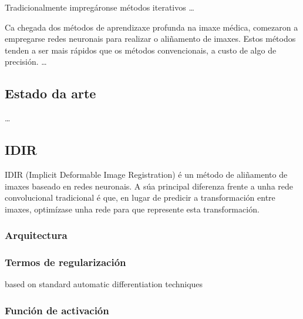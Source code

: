 Tradicionalmente impregáronse métodos iterativos \dots

Ca chegada dos métodos de aprendizaxe profunda na imaxe médica, comezaron a empregarse redes neuronais para realizar o aliñamento de imaxes.
Estos métodos tenden a ser mais rápidos que os métodos convencionais, a custo de algo de precisión. 
\dots

\subsection{Estado da arte}
\label{subsec:Estado da arte}

\dots

\subsection{IDIR}
\label{subsec:IDIR}
IDIR (Implicit Deformable Image Registration) é un método de aliñamento de imaxes baseado en redes neuronais. 
A súa principal diferenza frente a unha rede convolucional tradicional é que, 
en lugar de predicir a transformación entre imaxes, optimízase unha rede para que represente esta transformación.


\subsubsection{Arquitectura}
\label{subsubsec:Arquitectura}

\subsubsection{Termos de regularización}
\label{subsubsec:Termos de regularización}
 based on standard automatic differentiation techniques
 
\subsubsection{Función de activación}
\label{subsubsec:Función de activación}
